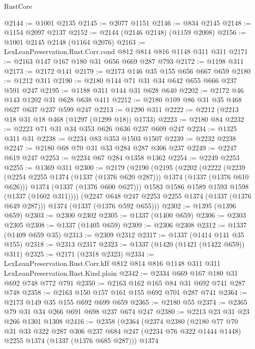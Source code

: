 \begin{lexlean}{RustCore}
\begin{coremodule}
@2144 := @1001 @2135
@2145 := @2077 @1151
@2146 := @834 @2145
@2148 := @1154 @2097 @2137
@2152 := @2144 (@2146 @2148) (@1159 @2008)
@2156 := @1001 @2145 @2148 (@1164 @2076)
@2163 := LexLeanPreservation.Rust.Corr.cond @812 @814 @816 @1148 @311 @311
@2171 := @2163 @147 @167 @180 @31 @656 @669 @287 @793
@2172 := @1198 @311
@2173 := @2172 @141
@2179 := @2173 @146 @35 @155 @656 @667 @659
@2180 := @1212 @311
@2190 := @2180 @144 @71 @31 @34 @642 @655 @666 @237 @591 @247
@2195 := @1188 @311 @144 @31 @628 @640
@2202 := @2172 @46 @143 @1202 @31 @628 @638 @411
@2212 := @2180 @109 @86 @31 @35 @468 @627 @637 @237 @599 @247
@2213 := @1290 @311
@2222 := @2212 (@2213 @18 @31 @18 @468 (@1297 (@1299 @18)) @1733)
@2223 := @2180 @84
@2232 := @2223 @71 @31 @34 @353 @626 @636 @237 @609 @247
@2234 := @1325 @311 @31
@2238 := @2234 @83 @353 @1503 @1507
@2239 := @2232 @2238
@2247 := @2180 @68 @70 @31 @33 @284 @287 @306 @237
@2249 := @2247 @619 @247
@2253 := @2234 @67 @284 @1358 @1362
@2254 := @2249 @2253
@2255 := @1369 @311
@2300 := @2179
    (@2190
      (@2195
        (@2202
          (@2222
            (@2239 (@2254 @2255 @1374 (@1337 (@1376 @620 @287))) @1374 (@1337 (@1376 @610 @626)))
            @1374
            (@1337 (@1376 @600 @627)))
          @1583
          @1586
          @1589
          @1593
          @1598
          (@1337 (@1602 @311))))
      (@2247 @648 @247 @2253 @2255 @1374 (@1337 (@1376 @649 @287)))
      @1374
      (@1337 (@1376 @592 @655)))
@2302 := @1395 (@1396 @659)
@2303 := @2300 @2302
@2305 := @1337 (@1400 @659)
@2306 := @2303 @2305
@2308 := @1337 (@1405 @659)
@2309 := @2306 @2308
@2312 := @1337 (@1409 @659 @35)
@2313 := @2309 @2312
@2317 := @1337 (@1414 @141 @35 @155)
@2318 := @2313 @2317
@2323 := @1337 (@1420 (@1421 (@1422 @659)) @311)
@2325 := @2171 (@2318 @2323)
@2334 := LexLeanPreservation.Rust.Corr.kIf
    @812
    @814
    @816
    @1148
    @311
    @311
    LexLeanPreservation.Rust.Kind.plain
@2342 := @2334 @669 @167 @180 @31 @692 @748 @772 @791
@2350 := @2163 @162 @165 @84 @31 @692 @741 @287 @748
@2358 := @2163 @150 @157 @161 @155 @692 @701 @287 @741
@2364 := @2173 @149 @35 @155 @692 @699 @659
@2365 := @2180 @55
@2374 := @2365 @79 @31 @34 @266 @691 @698 @237 @674 @247
@2380 := @2213 @23 @31 @23 @266 @1301 @1308
@2416 := @2358
    (@2364
      (@2374
        @2380
        (@2180
          @77
          @70
          @31
          @33
          @322
          @287
          @306
          @237
          @684
          @247
          (@2234 @76 @322 @1444 @1448)
          @2255
          @1374
          (@1337 (@1376 @685 @287)))
        @1374

\end{coremodule}
\end{lexlean}
